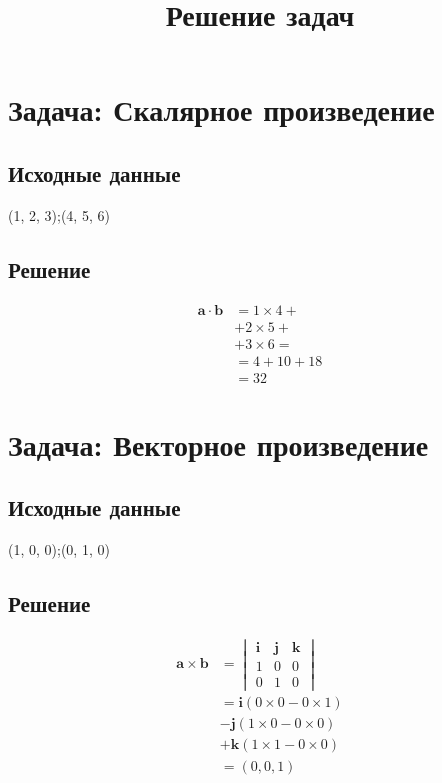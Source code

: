 \documentclass{article}
\begin{document}
\title{Решение задач}
\maketitle
\section{Задача: Скалярное произведение}
\subsection{Исходные данные}
(1, 2, 3);(4, 5, 6)
\subsection{Решение}
\begin{align*}
\mathbf{a} \cdot \mathbf{b} &= 
1 \times 4 + \\ &+ 
2 \times 5 + \\ &+ 
3 \times 6 = \\
&= 4 + 10 + 18 \\
&= 32
\end{align*}
\section{Задача: Векторное произведение}
\subsection{Исходные данные}
(1, 0, 0);(0, 1, 0)
\subsection{Решение}
\begin{align*}
\mathbf{a} \times \mathbf{b} &= \begin{vmatrix} \mathbf{i} & \mathbf{j} & \mathbf{k} \\ 1 & 0 & 0 \\ 0 & 1 & 0 \end{vmatrix} \\
&= \mathbf{i}(0 \times 0 - 0 \times 1) \\
&- \mathbf{j}(1 \times 0 - 0 \times 0) \\
&+ \mathbf{k}(1 \times 1 - 0 \times 0) \\
&= (0, 0, 1)
\end{align*}
\end{document}

